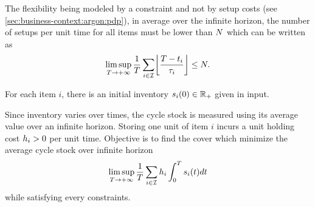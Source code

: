 The flexibility being modeled by a constraint and not by setup costs (see \cref{sec:business-context:argon:pdp}), in average over the infinite horizon, the number of setups per unit time for all items must be lower than $N$ which can be written as
\begin{equation}\label{eq:lot-size:single-line:deterministic:motivations:flexibility}
  \limsup_{\horizon\rightarrow+\infty} \frac{1}{\horizon} \sum_{i\in\REF} \left\lfloor\frac{\horizon-t_i}{\cover_i}\right\rfloor \le \nbsetups.
\end{equation}


For each item $i$, there is an initial inventory $\inventory_i\bracket{0}\in\RR_+$ given in input.


Since inventory varies over times, the cycle stock is measured using its average value over an infinite horizon.
Storing one unit of item $i$ incurs a unit holding cost $h_i>0$ per unit time.
Objective is to find the cover which minimize the average cycle stock over infinite horizon
\begin{equation}
  \limsup_{\horizon\rightarrow+\infty} \frac{1}{\horizon} \sum_{i\in\REF} \holding_i \int_0^{\horizon}\inventory_i\bracket{t}dt
\end{equation}
while satisfying every constraints.



